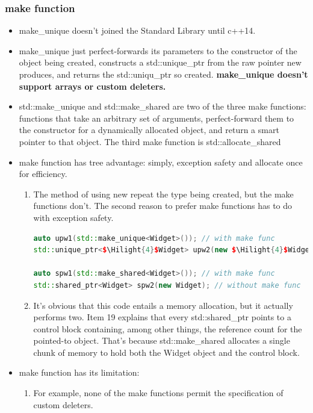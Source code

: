 \documentclass[a4paper,12pt,twoside]{book}
\newcommand{\Hilight}[1]{\makebox[0pt][l]{\color{yellow}\rule[-3pt]{#1em}{11pt}}}
\begin{document}
\subsubsection{make function}
\begin{itemize}
\item make\_unique doesn't joined the Standard Library until c++14.
\item make\_unique just perfect-forwards its parameters to the constructor of the object being created, constructs a std::unique\_ptr from the raw pointer new produces, and returns the std::uniqu\_ptr so created. \textbf{make\_unique doesn't support arrays or custom deleters.}

\item std::make\_unique and std::make\_shared are two of the three make functions: functions that take an arbitrary set of arguments, perfect-forward them to the constructor for a dynamically allocated object, and return a smart pointer to that object. The third make function is std::allocate\_shared
\item make function has tree advantage: simply, exception safety and allocate once for efficiency.

\begin{enumerate}
\item The method of using new repeat the type being created, but the make functions don't.  The second reason to prefer make functions has to do with exception safety.
\begin{lstlisting}[frame=single, language=c++, mathescape=true]
auto upw1(std::make_unique<Widget>()); // with make func
std::unique_ptr<$\Hilight{4}$Widget> upw2(new $\Hilight{4}$Widget); // without make func

auto spw1(std::make_shared<Widget>()); // with make func
std::shared_ptr<Widget> spw2(new Widget); // without make func
\end{lstlisting}

\item It's obvious that this code entails a memory allocation, but it actually performs two. Item 19 explains that every std::shared\_ptr points to a control block containing, among other things, the reference count for the pointed-to object. That's because std::make\_shared allocates a single chunk of
memory to hold both the Widget object and the control block.
\end{enumerate}

\item make function has its limitation:
\begin{enumerate}
\item For example, none of the make functions permit the specification of custom deleters.


\end{enumerate}
\end{itemize}
\end{document}
